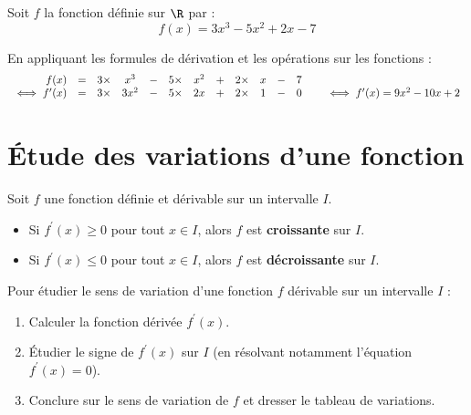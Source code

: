\begin{ex}
	Soit $f$ la fonction définie sur $\R$ par :
	\[
		f(x) = 3x^3 - 5x^2 + 2x - 7
	\]

	En appliquant les formules de dérivation et les opérations sur les fonctions :
	\[
		\def\arraystrech{1.5}
		\begin{array}{rccccccccccl}
			f(x)       & = & 3 \times & x^3  & - & 5 \times & x^2 & + & 2 \times & x & - & 7                                        \\
			\iff f'(x) & = & 3 \times & 3x^2 & - & 5 \times & 2x  & + & 2 \times & 1 & - & 0 \qquad\iff f^\prime(x)= 9x^2 - 10x + 2
		\end{array}
	\]
\end{ex}

\section{Étude des variations d'une fonction}

\begin{prop}
	Soit $f$ une fonction définie et dérivable sur un intervalle $I$.
	\begin{itemize}
		\item Si $f^\prime(x) \geq 0$ pour tout $x \in I$, alors $f$ est \textbf{croissante} sur $I$.
		\item Si $f^\prime(x) \leq 0$ pour tout $x \in I$, alors $f$ est \textbf{décroissante} sur $I$.
	\end{itemize}
\end{prop}

\begin{methode}
	Pour étudier le sens de variation d'une fonction $f$ dérivable sur un intervalle $I$ :
	\begin{enumerate}
		\item Calculer la fonction dérivée $f^\prime(x)$.
		\item Étudier le signe de $f^\prime(x)$ sur $I$ (en résolvant notamment l'équation $f^\prime(x) = 0$).
		\item Conclure sur le sens de variation de $f$ et dresser le tableau de variations.
	\end{enumerate}
\end{methode}

